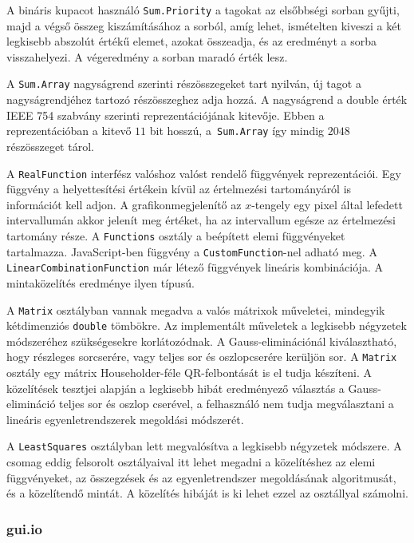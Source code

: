 A bináris kupacot használó \texttt{Sum.Priority} a tagokat az elsőbbségi sorban gyűjti, majd a végső összeg kiszámításához a sorból, amíg lehet, ismételten kiveszi a két legkisebb abszolút értékű elemet, azokat összeadja, és az eredményt a sorba visszahelyezi.
A végeredmény a sorban maradó érték lesz.

A \texttt{Sum.Array} nagyságrend szerinti részösszegeket tart nyilván, új tagot a nagyságrendjéhez tartozó részösszeghez adja hozzá.
A nagyságrend a double érték IEEE 754 szabvány szerinti reprezentációjának kitevője. Ebben a reprezentációban a kitevő $11$ bit hosszú, a\texttt{ Sum.Array} így mindig $2048$ részösszeget tárol.

A \texttt{RealFunction} interfész valóshoz valóst rendelő függvények reprezentációi.
Egy függvény a helyettesítési értékein kívül az értelmezési tartományáról is információt kell adjon.
A grafikonmegjelenítő az $x$-tengely egy pixel által lefedett intervallumán akkor jelenít meg értéket, ha az intervallum egésze az értelmezési tartomány része.
A \texttt{Functions} osztály a beépített elemi függvényeket tartalmazza.
JavaScript-ben függvény a \texttt{CustomFunction}-nel adható meg.
A \texttt{LinearCombinationFunction} már létező függvények lineáris kombinációja.
A mintaközelítés eredménye ilyen típusú.

A \texttt{Matrix} osztályban vannak megadva a valós mátrixok műveletei, mindegyik kétdimenziós \texttt{double} tömbökre.
Az implementált műveletek a legkisebb négyzetek módszeréhez szükségesekre korlátozódnak.
A Gauss-eliminációnál kiválasztható, hogy részleges sorcserére, vagy teljes sor és oszlopcserére kerüljön sor.
A \texttt{Matrix} osztály egy mátrix Householder-féle QR-felbontását is el tudja készíteni.
A közelítések tesztjei alapján a legkisebb hibát eredményező választás a Gauss-elimináció teljes sor és oszlop cserével, a felhasználó nem tudja megválasztani a lineáris egyenletrendszerek megoldási módszerét.

A \texttt{LeastSquares} osztályban lett megvalósítva a legkisebb négyzetek módszere.
A csomag eddig felsorolt osztályaival itt lehet megadni a közelítéshez az elemi függvényeket, az összegzések és az egyenletrendszer megoldásának algoritmusát, és a közelítendő mintát.
A közelítés hibáját is ki lehet ezzel az osztállyal számolni.

\subsubsection{gui.io}

